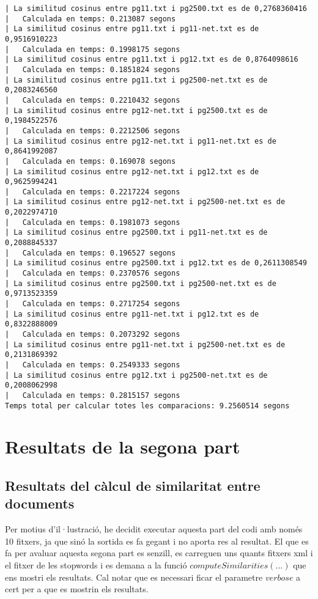 \documentclass{report}
\begin{document}
\begin{verbatim}
| La similitud cosinus entre pg11.txt i pg2500.txt es de 0,2768360416
|	Calculada en temps: 0.213087 segons
| La similitud cosinus entre pg11.txt i pg11-net.txt es de 0,9516910223
|	Calculada en temps: 0.1998175 segons
| La similitud cosinus entre pg11.txt i pg12.txt es de 0,8764098616
|	Calculada en temps: 0.1851824 segons
| La similitud cosinus entre pg11.txt i pg2500-net.txt es de 0,2083246560
|	Calculada en temps: 0.2210432 segons
| La similitud cosinus entre pg12-net.txt i pg2500.txt es de 0,1984522576
|	Calculada en temps: 0.2212506 segons
| La similitud cosinus entre pg12-net.txt i pg11-net.txt es de 0,8641992087
|	Calculada en temps: 0.169078 segons
| La similitud cosinus entre pg12-net.txt i pg12.txt es de 0,9625994241
|	Calculada en temps: 0.2217224 segons
| La similitud cosinus entre pg12-net.txt i pg2500-net.txt es de 0,2022974710
|	Calculada en temps: 0.1981073 segons
| La similitud cosinus entre pg2500.txt i pg11-net.txt es de 0,2088845337
|	Calculada en temps: 0.196527 segons
| La similitud cosinus entre pg2500.txt i pg12.txt es de 0,2611308549
|	Calculada en temps: 0.2370576 segons
| La similitud cosinus entre pg2500.txt i pg2500-net.txt es de 0,9713523359
|	Calculada en temps: 0.2717254 segons
| La similitud cosinus entre pg11-net.txt i pg12.txt es de 0,8322888009
|	Calculada en temps: 0.2073292 segons
| La similitud cosinus entre pg11-net.txt i pg2500-net.txt es de 0,2131869392
|	Calculada en temps: 0.2549333 segons
| La similitud cosinus entre pg12.txt i pg2500-net.txt es de 0,2008062998
|	Calculada en temps: 0.2815157 segons
Temps total per calcular totes les comparacions: 9.2560514 segons

\end{verbatim}

\newpage

\section{Resultats de la segona part}

\subsection{Resultats del càlcul de similaritat entre documents}

Per motius d'il·lustració, he decidit executar aquesta part del codi amb només 10 fitxers, ja que sinó la sortida es fa gegant i no aporta res al resultat. El que es fa per avaluar aquesta segona part es senzill, es carreguen uns quants fitxers xml i el fitxer de les stopwords i es demana a la funció $computeSimilarities(...)$ que ens mostri els resultats. Cal notar que es necessari ficar el parametre $verbose$ a cert per a que es mostrin els resultats.
\end{document}
